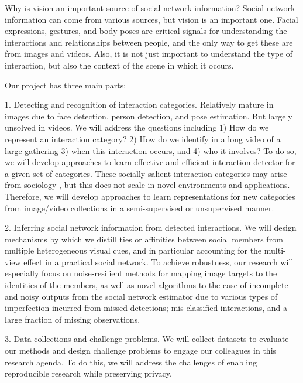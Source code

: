 Why is vision an important source of social network information? Social network information can come from various sources, but vision is an important one. Facial expressions, gestures, and body poses are critical signals for understanding the interactions and relationships between people, and the only way to get these are from images and videos. Also, it is not just important to understand the type of interaction, but also the context of the scene in which it occurs.

Our project has three main parts:

1. Detecting and recognition of interaction categories. Relatively mature in images due to face detection, person detection, and pose estimation. But largely unsolved in videos. We will address the questions including 1) How do we represent an interaction category? 2) How do we identify in a long video of a large gathering 3) when this interaction occurs, and 4) who it involves? To do so, we will develop approaches to learn effective and efficient interaction detector for  a given set of categories. These socially-salient interaction categories may arise from sociology \cite{Kendon1990,Ekman,Hoyle,Tannen,Goodwin2000,Goldin,Goodwin2007,Kendon2010,Lazer2009}, but this does not scale in novel environments and applications. Therefore, we will develop approaches to learn representations for new categories from image/video collections in a semi-supervised or unsupervised manner.

2. Inferring social network information from detected interactions. We will design mechanisms by which we distill ties or affinities between social members from multiple heterogeneous visual cues, and in particular accounting for the multi-view effect in a practical social network. To achieve robustness, our research will especially focus on noise-resilient methods for mapping image targets to the identities of the members, as well as novel algorithms to the case of incomplete and noisy outputs from the social network estimator due to various types of imperfection incurred from missed detections; mis-classified interactions, and a large fraction of missing observations.

3. Data collections and challenge problems. We will collect datasets to evaluate our methods and design challenge problems to engage our colleagues in this research agenda. To do this, we will address the challenges of enabling reproducible research while preserving privacy.

